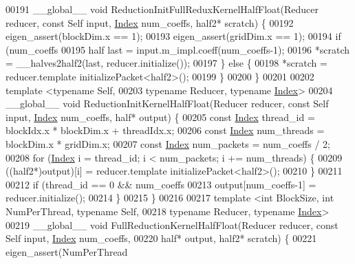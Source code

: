 \begin{DoxyCode}
00191 \_\_global\_\_ \textcolor{keywordtype}{void} ReductionInitFullReduxKernelHalfFloat(Reducer reducer, \textcolor{keyword}{const} Self input, 
      \hyperlink{namespace_eigen_a62e77e0933482dafde8fe197d9a2cfde}{Index} num\_coeffs, half2* scratch) \{
00192   eigen\_assert(blockDim.x == 1);
00193   eigen\_assert(gridDim.x == 1);
00194   \textcolor{keywordflow}{if} (num\_coeffs %
00195     half last = input.m\_impl.coeff(num\_coeffs-1);
00196     *scratch = \_\_halves2half2(last, reducer.initialize());
00197   \} \textcolor{keywordflow}{else} \{
00198     *scratch = reducer.template initializePacket<half2>();
00199   \}
00200 \}
00201 
00202 \textcolor{keyword}{template} <\textcolor{keyword}{typename} Self,
00203           \textcolor{keyword}{typename} Reducer, \textcolor{keyword}{typename} \hyperlink{namespace_eigen_a62e77e0933482dafde8fe197d9a2cfde}{Index}>
00204 \_\_global\_\_ \textcolor{keywordtype}{void} ReductionInitKernelHalfFloat(Reducer reducer, \textcolor{keyword}{const} Self input, 
      \hyperlink{namespace_eigen_a62e77e0933482dafde8fe197d9a2cfde}{Index} num\_coeffs, half* output) \{
00205   \textcolor{keyword}{const} \hyperlink{namespace_eigen_a62e77e0933482dafde8fe197d9a2cfde}{Index} thread\_id = blockIdx.x * blockDim.x + threadIdx.x;
00206   \textcolor{keyword}{const} \hyperlink{namespace_eigen_a62e77e0933482dafde8fe197d9a2cfde}{Index} num\_threads = blockDim.x * gridDim.x;
00207   \textcolor{keyword}{const} \hyperlink{namespace_eigen_a62e77e0933482dafde8fe197d9a2cfde}{Index} num\_packets = num\_coeffs / 2;
00208   \textcolor{keywordflow}{for} (\hyperlink{namespace_eigen_a62e77e0933482dafde8fe197d9a2cfde}{Index} i = thread\_id; i < num\_packets; i += num\_threads) \{
00209     ((half2*)output)[i] = reducer.template initializePacket<half2>();
00210   \}
00211 
00212   \textcolor{keywordflow}{if} (thread\_id == 0 && num\_coeffs %
00213     output[num\_coeffs-1] = reducer.initialize();
00214   \}
00215 \}
00216 
00217 \textcolor{keyword}{template} <\textcolor{keywordtype}{int} BlockSize, \textcolor{keywordtype}{int} NumPerThread, \textcolor{keyword}{typename} Self,
00218           \textcolor{keyword}{typename} Reducer, \textcolor{keyword}{typename} \hyperlink{namespace_eigen_a62e77e0933482dafde8fe197d9a2cfde}{Index}>
00219 \_\_global\_\_ \textcolor{keywordtype}{void} FullReductionKernelHalfFloat(Reducer reducer, \textcolor{keyword}{const} Self input, 
      \hyperlink{namespace_eigen_a62e77e0933482dafde8fe197d9a2cfde}{Index} num\_coeffs,
00220                                     half* output, half2* scratch) \{
00221   eigen\_assert(NumPerThread %

\end{DoxyCode}
